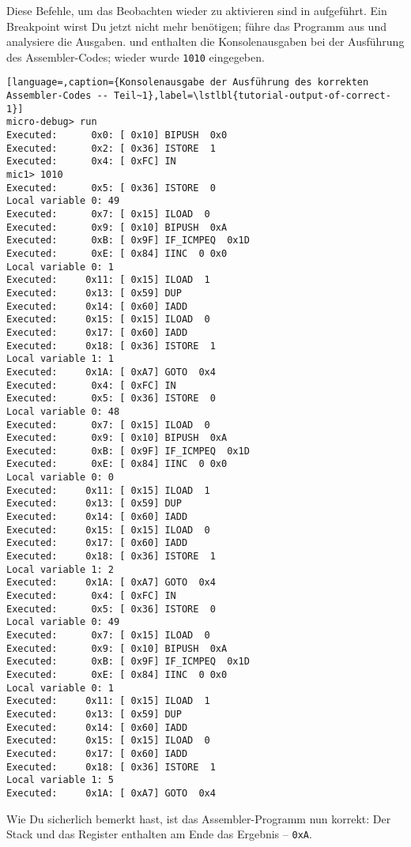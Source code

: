 Diese Befehle, um das Beobachten wieder zu aktivieren sind in  aufgeführt. Ein Breakpoint wirst Du jetzt nicht mehr benötigen; führe das Programm aus und analysiere die Ausgaben.  und  enthalten die Konsolenausgaben bei der Ausführung des Assembler-Codes; wieder wurde \texttt{1010} eingegeben.

\begin{lstlisting}[language=,caption={Konsolenausgabe der Ausführung des korrekten Assembler-Codes -- Teil~1},label=\lstlbl{tutorial-output-of-correct-1}]
micro-debug> run
Executed:      0x0: [ 0x10] BIPUSH  0x0
Executed:      0x2: [ 0x36] ISTORE  1
Executed:      0x4: [ 0xFC] IN 
mic1> 1010
Executed:      0x5: [ 0x36] ISTORE  0
Local variable 0: 49
Executed:      0x7: [ 0x15] ILOAD  0
Executed:      0x9: [ 0x10] BIPUSH  0xA
Executed:      0xB: [ 0x9F] IF_ICMPEQ  0x1D
Executed:      0xE: [ 0x84] IINC  0 0x0
Local variable 0: 1
Executed:     0x11: [ 0x15] ILOAD  1
Executed:     0x13: [ 0x59] DUP 
Executed:     0x14: [ 0x60] IADD 
Executed:     0x15: [ 0x15] ILOAD  0
Executed:     0x17: [ 0x60] IADD 
Executed:     0x18: [ 0x36] ISTORE  1
Local variable 1: 1
Executed:     0x1A: [ 0xA7] GOTO  0x4
Executed:      0x4: [ 0xFC] IN 
Executed:      0x5: [ 0x36] ISTORE  0
Local variable 0: 48
Executed:      0x7: [ 0x15] ILOAD  0
Executed:      0x9: [ 0x10] BIPUSH  0xA
Executed:      0xB: [ 0x9F] IF_ICMPEQ  0x1D
Executed:      0xE: [ 0x84] IINC  0 0x0
Local variable 0: 0
Executed:     0x11: [ 0x15] ILOAD  1
Executed:     0x13: [ 0x59] DUP 
Executed:     0x14: [ 0x60] IADD 
Executed:     0x15: [ 0x15] ILOAD  0
Executed:     0x17: [ 0x60] IADD 
Executed:     0x18: [ 0x36] ISTORE  1
Local variable 1: 2
Executed:     0x1A: [ 0xA7] GOTO  0x4
Executed:      0x4: [ 0xFC] IN 
Executed:      0x5: [ 0x36] ISTORE  0
Local variable 0: 49
Executed:      0x7: [ 0x15] ILOAD  0
Executed:      0x9: [ 0x10] BIPUSH  0xA
Executed:      0xB: [ 0x9F] IF_ICMPEQ  0x1D
Executed:      0xE: [ 0x84] IINC  0 0x0
Local variable 0: 1
Executed:     0x11: [ 0x15] ILOAD  1
Executed:     0x13: [ 0x59] DUP 
Executed:     0x14: [ 0x60] IADD 
Executed:     0x15: [ 0x15] ILOAD  0
Executed:     0x17: [ 0x60] IADD 
Executed:     0x18: [ 0x36] ISTORE  1
Local variable 1: 5
Executed:     0x1A: [ 0xA7] GOTO  0x4
\end{lstlisting}

Wie Du sicherlich bemerkt hast, ist das Assembler-Programm nun korrekt: Der Stack und das Register  enthalten am Ende das Ergebnis -- \texttt{0xA}.

